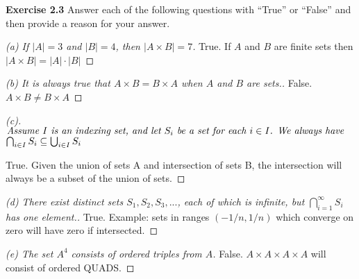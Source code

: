 \documentclass[12pt,oneside]{article}
\newenvironment{exercise}[1]{\vspace{.1in}\noindent\textbf{Exercise #1 \hspace{.05em}}}{}
\begin{document}
\begin{exercise}{2.3}
Answer each of the following questions with “True” or “False” and
then provide a reason for your answer.

\end{exercise}

\begin{proof}[(a) If $|A| = 3$ and $|B| = 4$, then $ |A \times B| = 7$]

\item True. If $A$ and $B$ are finite sets then $|A \times B|=|A| \cdot |B|$

\end{proof}

\begin{proof}[(b) It is always true that $A \times B = B \times A$ when $A$ and $B$ are sets.]

\item False. $A \times B \neq B \times A$

\end{proof}

\begin{proof}[(c)] 
$\emph{Assume $I$ is an indexing set, and let $S_i$ be a set for each $i \in I$. We always have}$ \\ $\emph{$\bigcap_{i\in I}S_i \subseteq \bigcup_{i\in I}S_i$}$


\item True. Given the union of sets A and intersection of sets B, the intersection will always be a subset of the union of sets.

\end{proof}

\begin{proof}[(d) There exist distinct sets $S_1, S_2, S_3, . . .$, each of which is infinite, but $\bigcap_{i=1}^\infty S_i$ has one element.]

\item True. Example: sets in ranges $(-1/n, 1/n)$ which converge on zero will have zero if intersected.

\end{proof}

\begin{proof}[(e) The set $A^4$ consists of ordered triples from $A$]

\item False. $A \times A \times A \times A$ will consist of ordered QUADS.

\end{proof}
\end{document}
